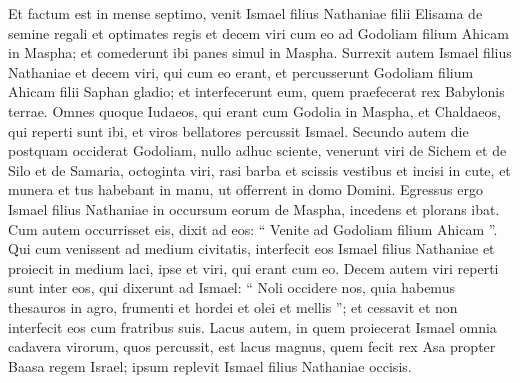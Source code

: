 \begin{biblechapter}
\begin{biblechapter}
\begin{biblechapter}
\begin{biblechapter}
\begin{biblechapter}
\begin{biblechapter}
\begin{biblechapter}
\begin{biblechapter}
\begin{biblechapter}
\begin{biblechapter}
\begin{biblechapter}
\begin{biblechapter}
\begin{biblechapter}
\begin{biblechapter}
\begin{biblechapter}
\begin{biblechapter}
\begin{biblechapter}
\begin{biblechapter}
\begin{biblechapter}
\begin{biblechapter}
\begin{biblechapter}
\begin{biblechapter}
\begin{biblechapter}
\begin{biblechapter}
\begin{biblechapter}
\begin{biblechapter}
\begin{biblechapter}
\begin{biblechapter}
\begin{biblechapter}
\begin{biblechapter}
\begin{biblechapter}
\begin{biblechapter}
\begin{biblechapter}
\begin{biblechapter}
\begin{biblechapter}
\begin{biblechapter}
\begin{biblechapter}
\begin{biblechapter}
\begin{biblechapter}
\begin{biblechapter}
\begin{biblechapter}
\verse Et factum est in mense septimo, venit Ismael filius Nathaniae filii Elisama de semine regali et optimates regis et decem viri cum eo ad Godoliam filium Ahicam in Maspha; et comederunt ibi panes simul in Maspha. 
\verse Surrexit autem Ismael filius Nathaniae et decem viri, qui cum eo erant, et percusserunt Godoliam filium Ahicam filii Saphan gladio; et interfecerunt eum, quem praefecerat rex Babylonis terrae. 
\verse Omnes quoque Iudaeos, qui erant cum Godolia in Maspha, et Chaldaeos, qui reperti sunt ibi, et viros bellatores percussit Ismael.
 \verse Secundo autem die postquam occiderat Godoliam, nullo adhuc sciente, 
\verse venerunt viri de Sichem et de Silo et de Samaria, octoginta viri, rasi barba et scissis vestibus et incisi in cute, et munera et tus habebant in manu, ut offerrent in domo Domini. 
\verse Egressus ergo Ismael filius Nathaniae in occursum eorum de Maspha, incedens et plorans ibat. Cum autem occurrisset eis, dixit ad eos: “ Venite ad Godoliam filium Ahicam ”. 
\verse Qui cum venissent ad medium civitatis, interfecit eos Ismael filius Nathaniae et proiecit in medium laci, ipse et viri, qui erant cum eo. 
\verse Decem autem viri reperti sunt inter eos, qui dixerunt ad Ismael: “ Noli occidere nos, quia habemus thesauros in agro, frumenti et hordei et olei et mellis ”; et cessavit et non interfecit eos cum fratribus suis. 
\verse Lacus autem, in quem proiecerat Ismael omnia cadavera virorum, quos percussit, est lacus magnus, quem fecit rex Asa propter Baasa regem Israel; ipsum replevit Ismael filius Nathaniae occisis. 

\end{biblechapter}
\end{biblechapter}
\end{biblechapter}
\end{biblechapter}
\end{biblechapter}
\end{biblechapter}
\end{biblechapter}
\end{biblechapter}
\end{biblechapter}
\end{biblechapter}
\end{biblechapter}
\end{biblechapter}
\end{biblechapter}
\end{biblechapter}
\end{biblechapter}
\end{biblechapter}
\end{biblechapter}
\end{biblechapter}
\end{biblechapter}
\end{biblechapter}
\end{biblechapter}
\end{biblechapter}
\end{biblechapter}
\end{biblechapter}
\end{biblechapter}
\end{biblechapter}
\end{biblechapter}
\end{biblechapter}
\end{biblechapter}
\end{biblechapter}
\end{biblechapter}
\end{biblechapter}
\end{biblechapter}
\end{biblechapter}
\end{biblechapter}
\end{biblechapter}
\end{biblechapter}
\end{biblechapter}
\end{biblechapter}
\end{biblechapter}
\end{biblechapter}
